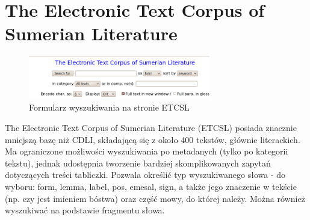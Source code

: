 
\section{The Electronic Text Corpus of Sumerian Literature \cite{etcsl}} 
\begin{figure}[h]
 \centering
 \includegraphics[width=300px]{../diagramy/etcsl-search.png}
 \caption{Formularz wyszukiwania na stronie ETCSL}
 \label{fig:etcsl-search}
\end{figure}

The Electronic Text Corpus of Sumerian Literature (ETCSL) posiada znacznie mniejszą bazę niż CDLI, składającą się z około 400 tekstów, głównie literackich. 
Ma ograniczone możliwości wyszukiwania po metadanych (tylko po kategorii tekstu), jednak udostępnia tworzenie bardziej 
skomplikowanych zapytań dotyczących treści tabliczki. 
Pozwala określić typ wyszukiwanego słowa - do wyboru: form, lemma, label, pos, emesal, sign,
a także jego znaczenie w tekście (np. czy jest imieniem bóstwa) oraz część mowy, do której należy. 
Można również wyszukiwać na podstawie fragmentu słowa.
